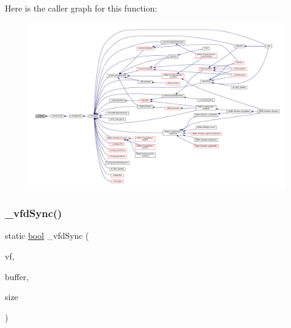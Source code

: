 Here is the caller graph for this function\+:
\nopagebreak
\begin{figure}[H]
\begin{center}
\leavevmode
\includegraphics[width=350pt]{vfs-fd_8c_a104ce2895f52876ad1c5583560b0e65f_icgraph}
\end{center}
\end{figure}
\mbox{\label{vfs-fd_8c_a53a7d14ded6594e1dd5e9ace626fb413}} 
\subsubsection{\texorpdfstring{\+\_\+vfd\+Sync()}{\_vfdSync()}}
{\footnotesize\ttfamily static \mbox{\hyperlink{libretro_8h_a4a26dcae73fb7e1528214a068aca317e}{bool}} \+\_\+vfd\+Sync (\begin{DoxyParamCaption}\item[{struct V\+File $\ast$}]{vf,  }\item[{const void $\ast$}]{buffer,  }\item[{size\+\_\+t}]{size }\end{DoxyParamCaption})\hspace{0.3cm}{\ttfamily [static]}}

